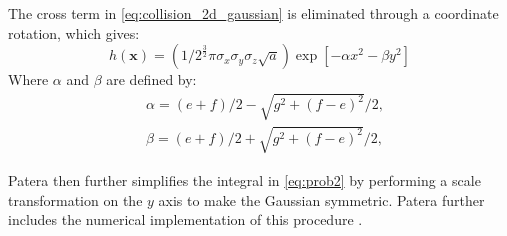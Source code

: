 The cross term in \autoref{eq:collision_2d_gaussian} is eliminated through a coordinate rotation, which gives:
\begin{equation}
    h(\boldsymbol{x})=\left(1 / 2^{\frac{3}{2}} \pi \sigma_{x} \sigma_{y} \sigma_{z} \sqrt{a}\right) \exp \left[-\alpha x^{2}-\beta y^{2}\right]
    \label{eq:collision_2d_gaussian:rotated}
\end{equation}
Where $\alpha$ and $\beta$ are defined by:
\begin{subequations}
    \begin{alignat}{1}
         & \alpha=(e+f) / 2-\sqrt{g^2+(f-e)^2} / 2, \\
         & \beta=(e+f) / 2+\sqrt{g^2+(f-e)^2} / 2,
    \end{alignat}
\end{subequations}

Patera then further simplifies the integral in \autoref{eq:prob2} by performing a scale transformation on the $y$ axis to make the Gaussian symmetric. Patera further includes the numerical implementation of this procedure \cite{Patera2001}.







